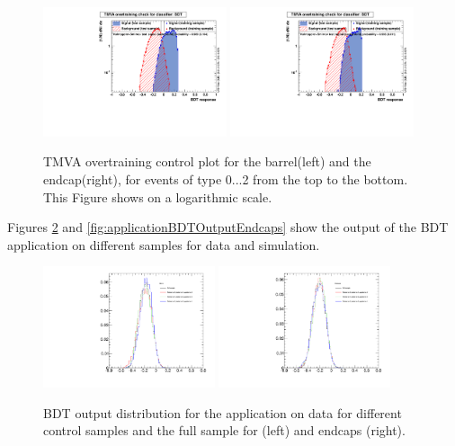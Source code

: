 \begin{figure}
                \includegraphics[width=0.48\textwidth]{Figures/bdt/overtrain_BDT_barrel_2_log}
                \includegraphics[width=0.48\textwidth]{Figures/bdt/overtrain_BDT_endcaps_2_log}
        \caption{TMVA overtraining control plot for the barrel(left) and the endcap(right), for events of type 0...2 from the top to the bottom. This Figure shows on a logarithmic scale. }
        \label{fig:overtrain_BDT_controlPlots_log}
\end{figure}


Figures \ref{fig:applicationBDTOutputBarrel} and \ref{fig:applicationBDTOutputEndcaps} show the output of the BDT application on different samples for data and \BsMuMu simulation.

\begin{figure}
  \centering
  \includegraphics[width=0.45\textwidth]{Figures/ApplicationBDTOutput_Barrel.pdf}
  \includegraphics[width=0.45\textwidth]{Figures/ApplicationBDTOutput_Endcaps.pdf}
  \caption{BDT output distribution for the application on data for different control samples and the full sample for (left) and endcaps (right).}
  \label{fig:applicationBDTOutputBarrel}
\end{figure}

